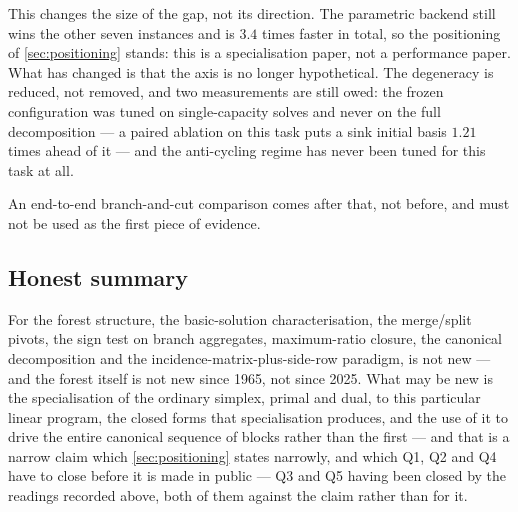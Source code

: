 This changes the size of the gap, not its direction. The parametric backend
still wins the other seven instances and is $3.4$ times faster in total, so the
positioning of \cref{sec:positioning} stands: this is a specialisation paper,
not a performance paper. What has changed is that the axis is no longer
hypothetical. The degeneracy is reduced, not removed, and two measurements are
still owed: the frozen configuration was tuned on single-capacity solves and
never on the full decomposition --- a paired ablation on this task puts a sink
initial basis $1.21$ times ahead of it --- and the anti-cycling regime has never
been tuned for this task at all.

An end-to-end
branch-and-cut comparison comes after that, not before, and must not be used as
the first piece of evidence.

\subsection{Honest summary}

For the forest structure, the basic-solution characterisation, the merge/split
pivots, the sign test on branch aggregates, maximum-ratio closure, the canonical
decomposition and the incidence-matrix-plus-side-row paradigm, \FS{} is not new
--- and the forest itself is not new since 1965, not since 2025. What may be new is
the specialisation of the ordinary simplex, primal and dual, to this particular
linear program, the closed forms that specialisation produces, and the use of it
to drive the entire canonical sequence of blocks rather than the first ---
and that is a narrow claim which \cref{sec:positioning} states narrowly, and
which Q1, Q2 and Q4 have to close before it is made in public --- Q3 and Q5
having been closed by the readings recorded above, both of them against the
claim rather than for it.
